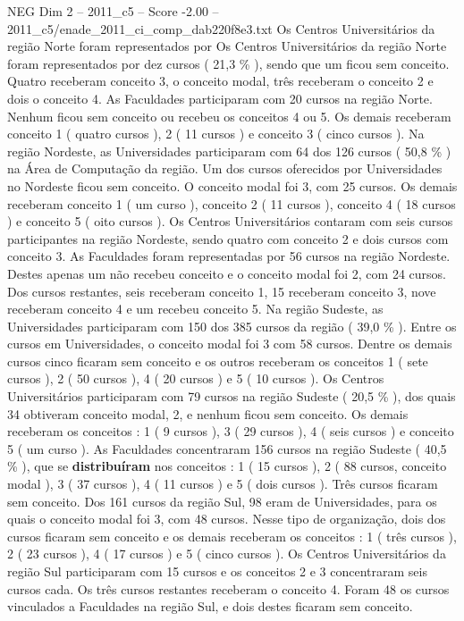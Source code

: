 \begin{textsample}{NEG Dim 2 – 2011\_c5 – Score -2.00 – 2011\_c5/enade\_2011\_ci\_comp\_dab220f8e3.txt}
Os Centros Universitários da região Norte foram representados por Os Centros Universitários da região Norte foram representados por dez cursos ( 21,3 \% ), sendo que um ficou sem conceito.
Quatro receberam conceito 3, o conceito modal, três receberam o conceito 2 e dois o conceito 4.
As Faculdades participaram com 20 cursos na região Norte.
Nenhum ficou sem conceito ou recebeu os conceitos 4 ou 5.
Os demais receberam conceito 1 ( quatro cursos ), 2 ( 11 cursos ) e conceito 3 ( cinco cursos ).
Na região Nordeste, as Universidades participaram com 64 dos 126 cursos ( 50,8 \% ) na Área de Computação da região.
Um dos cursos oferecidos por Universidades no Nordeste ficou sem conceito.
O conceito modal foi 3, com 25 cursos.
Os demais receberam conceito 1 ( um curso ), conceito 2 ( 11 cursos ), conceito 4 ( 18 cursos ) e conceito 5 ( oito cursos ).
Os Centros Universitários contaram com seis cursos participantes na região Nordeste, sendo quatro com conceito 2 e dois cursos com conceito 3.
As Faculdades foram representadas por 56 cursos na região Nordeste.
Destes apenas um não recebeu conceito e o conceito modal foi 2, com 24 cursos.
Dos cursos restantes, seis receberam conceito 1, 15 receberam conceito 3, nove receberam conceito 4 e um recebeu conceito 5.
Na região Sudeste, as Universidades participaram com 150 dos 385 cursos da região ( 39,0 \% ).
Entre os cursos em Universidades, o conceito modal foi 3 com 58 cursos.
Dentre os demais cursos cinco ficaram sem conceito e os outros receberam os conceitos 1 ( sete cursos ), 2 ( 50 cursos ), 4 ( 20 cursos ) e 5 ( 10 cursos ).
Os Centros Universitários participaram com 79 cursos na região Sudeste ( 20,5 \% ), dos quais 34 obtiveram conceito modal, 2, e nenhum ficou sem conceito.
Os demais receberam os conceitos : 1 ( 9 cursos ), 3 ( 29 cursos ), 4 ( seis cursos ) e conceito 5 ( um curso ).
As Faculdades concentraram 156 cursos na região Sudeste ( 40,5 \% ), que se \textbf{distribuíram} nos conceitos : 1 ( 15 cursos ), 2 ( 88 cursos, conceito modal ), 3 ( 37 cursos ), 4 ( 11 cursos ) e 5 ( dois cursos ).
Três cursos ficaram sem conceito.
Dos 161 cursos da região Sul, 98 eram de Universidades, para os quais o conceito modal foi 3, com 48 cursos.
Nesse tipo de organização, dois dos cursos ficaram sem conceito e os demais receberam os conceitos : 1 ( três cursos ), 2 ( 23 cursos ), 4 ( 17 cursos ) e 5 ( cinco cursos ).
Os Centros Universitários da região Sul participaram com 15 cursos e os conceitos 2 e 3 concentraram seis cursos cada.
Os três cursos restantes receberam o conceito 4.
Foram 48 os cursos vinculados a Faculdades na região Sul, e dois destes ficaram sem conceito.

\end{textsample}
